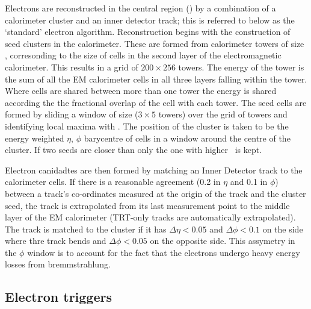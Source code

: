Electrons are reconstructed in the central region () by a
combination of a calorimeter cluster and an inner detector track; this is
referred to below as the `standard' electron algorithm. Reconstruction begins
with the construction of seed clusters in the calorimeter. These are formed from
calorimeter towers of size , corresonding to the
size of cells in the second layer of the electromagnetic calorimeter. This
results in a grid of $200 \times 256$ towers. The energy
of the tower is the sum of all the EM calorimeter cells in all three layers
falling within the tower. Where cells are shared between more than one tower the
energy is shared according the the fractional overlap of the cell with each
tower. The seed cells are formed by sliding a
window of size  ($3 \times 5$ towers) over the
grid of towers and identifying local maxima with  \gev. The position
of the cluster is taken to be the energy weighted $\eta$, $\phi$ barycentre of
cells in a window around the centre of the cluster. If two seeds are closer than
 only the one with higher \et\ is kept.

Electron canidadtes are then formed by matching an Inner Detector track to the
calorimeter cells. If there is a reasonable agreement (0.2 in $\eta$ and 0.1 in
$\phi$) between a track's co-ordinates measured at the origin of the track and
the cluster seed, the track is extrapolated from its last measurement point to
the middle layer of the EM calorimeter (TRT-only tracks are automatically
extrapolated). The track is matched to the cluster if it has $\Delta \eta <
0.05$ and $\Delta \phi < 0.1$ on the side where thre track bends and  $\Delta
\phi < 0.05$ on the opposite side. This assymetry in the $\phi$ window is to
account for the fact that the electrons undergo heavy energy losses from
bremmstrahlung.

\subsection{Electron triggers}
\label{sec:reco-el-triggers}
